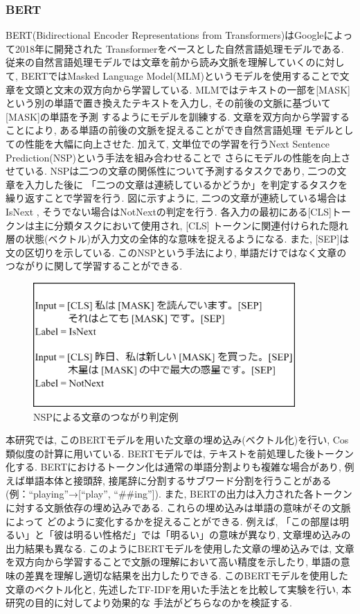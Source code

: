 \documentclass{ltjarticle}
\begin{document}
\subsubsection{BERT}
BERT(Bidirectional Encoder Representations from Transformers)はGoogleによって2018年に開発された
Transformerをベースとした自然言語処理モデルである. 従来の自然言語処理モデルでは文章を前から読み文脈を理解していくのに対して, 
BERTではMasked Language Model(MLM)というモデルを使用することで文章を文頭と文末の双方向から学習している. 
MLMではテキストの一部を[MASK]という別の単語で置き換えたテキストを入力し, その前後の文脈に基づいて[MASK]の単語を予測
するようにモデルを訓練する. 文章を双方向から学習することにより, ある単語の前後の文脈を捉えることができ自然言語処理
モデルとしての性能を大幅に向上させた. 加えて, 文単位での学習を行うNext Sentence Prediction(NSP)という手法を組み合わせることで
さらにモデルの性能を向上させている. NSPは二つの文章の関係性について予測するタスクであり, 二つの文章を入力した後に
「二つの文章は連続しているかどうか」を判定するタスクを繰り返すことで学習を行う. 図に示すように, 二つの文章が連続している場合はIsNext
, そうでない場合はNotNextの判定を行う. 各入力の最初にある[CLS]トークンは主に分類タスクにおいて使用され, [CLS]
トークンに関連付けられた隠れ層の状態(ベクトル)が入力文の全体的な意味を捉えるようになる. また, [SEP]は文の区切りを示している. 
このNSPという手法により, 単語だけではなく文章のつながりに関して学習することができる. 
\vspace{10truept}

\begin{figure}[ht]
    \centering
    \includegraphics[width=10cm]{images/BERT.drawio.png}
    \caption{NSPによる文章のつながり判定例}
    \label{fig:BERT}
\end{figure}
\newpage

本研究では, このBERTモデルを用いた文章の埋め込み(ベクトル化)を行い, Cos類似度の計算に用いている. 
BERTモデルでは, テキストを前処理した後トークン化する. BERTにおけるトークン化は通常の単語分割よりも複雑な場合があり, 
例えば単語本体と接頭辞, 接尾辞に分割するサブワード分割を行うことがある(例：``playing''→[``play'', ``\#\#ing'']). 
また, BERTの出力は入力された各トークンに対する文脈依存の埋め込みである. これらの埋め込みは単語の意味がその文脈によって
どのように変化するかを捉えることができる. 例えば, 「この部屋は明るい」と「彼は明るい性格だ」では「明るい」の意味が異なり, 
文章埋め込みの出力結果も異なる. 
このようにBERTモデルを使用した文章の埋め込みでは, 文章を双方向から学習することで文脈の理解において高い精度を示したり, 
単語の意味の差異を理解し適切な結果を出力したりできる. 
このBERTモデルを使用した文章のベクトル化と, 先述したTF-IDFを用いた手法とを比較して実験を行い, 本研究の目的に対してより効果的な
手法がどちらなのかを検証する. 
\vspace{30truept}
\end{document}

